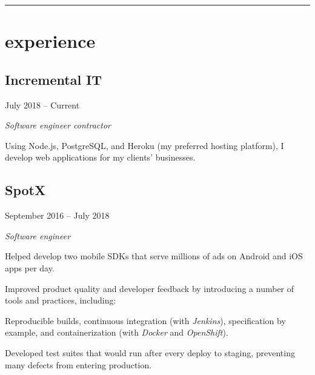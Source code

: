 \setlength{\parindent}{0cm}
\setlength{\parskip}{0.5em}

\begin{samepage}
  \hrule
  \section*{experience}
\end{samepage}

\noindent\begin{minipage}[t]{0.5\textwidth}
  \subsection*{Incremental IT}
\end{minipage}
\noindent\begin{minipage}[t]{0.5\textwidth}
  \flushright
  July 2018 -- Current
\end{minipage}

\emph{Software engineer contractor}

\begin{itemize}
  {\small
  \item Using Node.js, PostgreSQL, and Heroku (my preferred hosting platform), I
    develop web applications for my clients' businesses.
  }
\end{itemize}

\noindent\begin{minipage}[t]{0.5\textwidth}
  \subsection*{SpotX}
\end{minipage}
\noindent\begin{minipage}[t]{0.5\textwidth}
  \flushright
  September 2016 -- July 2018
\end{minipage}

\emph{Software engineer}

\begin{itemize}
  {\small
  \item Helped develop two mobile SDKs that serve millions of ads on Android and
    iOS apps per day.
  \item Improved product quality and developer feedback by introducing a number
    of tools and practices, including:
  \item Reproducible builds, continuous integration (with
    \emph{Jenkins}), specification by example, and containerization (with
    \emph{Docker} and \emph{OpenShift}).
  \item Developed test suites that would run after every deploy to
    staging, preventing many defects from entering production.
  }
\end{itemize}


